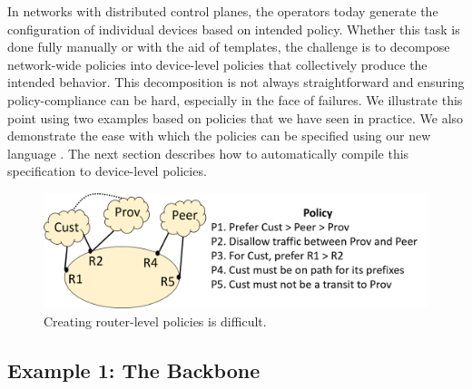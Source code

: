 %

In networks with distributed control planes, the operators today generate the configuration of individual devices based on intended policy. Whether this task is done fully manually or with the aid of templates, the challenge is to decompose network-wide policies
into device-level policies that collectively produce the intended behavior.
This decomposition is not always straightforward and ensuring policy-compliance can be hard, especially in the face of failures. We illustrate this point using two examples based on policies that we have seen in practice. We also demonstrate the ease with which the
policies can be specified using our new language \sysname. The next section describes how to automatically compile this specification to device-level policies.

\begin{figure}[t!]
\centering
\includegraphics[width=\columnwidth]{figures/example1}
\caption{Creating router-level policies is difficult.}
\label{fig:example1}
\end{figure}

\subsection{Example 1:  The Backbone}

